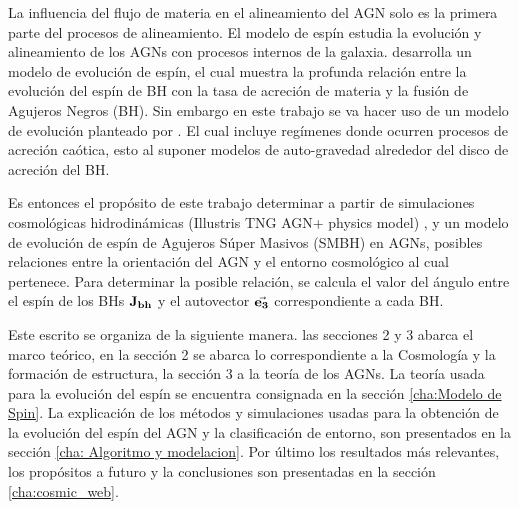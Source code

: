 La influencia del flujo de materia en el alineamiento del AGN solo es la primera parte del procesos de alineamiento. El modelo de espín estudia la evolución y alineamiento de los AGNs con procesos internos de la galaxia. \cite{fanidakis2011} desarrolla un modelo de evolución de espín, el cual  muestra la profunda relación entre la evolución del espín de BH con la tasa de acreción de materia y la fusión de Agujeros Negros (BH). Sin embargo en este trabajo se va hacer uso de un modelo de evolución planteado por \cite{Bustamante2018b}. El cual incluye regímenes donde ocurren procesos de acreción caótica, esto al suponer modelos de auto-gravedad alrededor del disco de acreción del BH. 
 
Es entonces el propósito de este trabajo determinar a partir de simulaciones cosmológicas hidrodinámicas (Illustris TNG AGN+ physics model) \cite{springel2010}, y un modelo de evolución de espín de Agujeros Súper Masivos (SMBH) en AGNs, posibles relaciones entre la orientación del AGN y el entorno cosmológico al cual pertenece. Para  determinar la posible relación, se calcula el valor del ángulo entre el espín de los BHs ${\bf{J_{bh}}}$ y el autovector $\vec{\bf{e_3}}$ correspondiente a cada BH.

Este escrito se organiza de la siguiente manera. las secciones 2 y 3 abarca el marco teórico, en la sección 2 se abarca lo correspondiente a la Cosmología y la formación de estructura, la sección 3 a la teoría de los AGNs. La teoría usada para la evolución del espín se encuentra consignada en la sección \ref{cha:Modelo de Spin}. La explicación de los métodos y simulaciones usadas para la obtención de la evolución del espín del AGN y la clasificación de entorno, son presentados en la sección \ref{cha: Algoritmo y modelacion}. Por último los resultados más relevantes, los propósitos a futuro y la conclusiones son presentadas en la sección \ref{cha:cosmic_web}.

